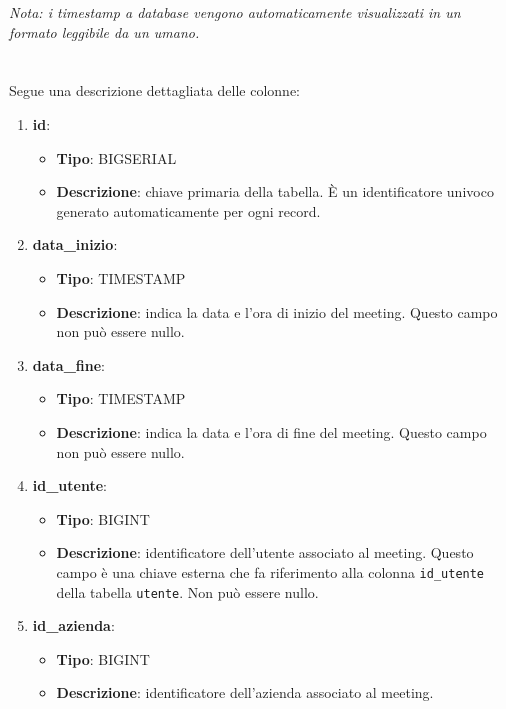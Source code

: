 \textit{Nota: i timestamp a database vengono automaticamente visualizzati in un formato leggibile da un umano.}
\\
\\
\\
Segue una descrizione dettagliata delle colonne:
\begin{enumerate}
    \item \textbf{id}:
        \begin{itemize}
            \item \textbf{Tipo}: BIGSERIAL
            \item \textbf{Descrizione}: chiave primaria della tabella. È un identificatore univoco generato automaticamente per ogni record.
        \end{itemize}
    \item \textbf{data_inizio}:
        \begin{itemize}
            \item \textbf{Tipo}: TIMESTAMP
            \item \textbf{Descrizione}: indica la data e l'ora di inizio del meeting. Questo campo non può essere nullo.
        \end{itemize}
    \item \textbf{data_fine}:
        \begin{itemize}
            \item \textbf{Tipo}: TIMESTAMP
            \item \textbf{Descrizione}: indica la data e l'ora di fine del meeting. Questo campo non può essere nullo.
        \end{itemize}
    \item \textbf{id_utente}:
        \begin{itemize}
            \item \textbf{Tipo}: BIGINT
            \item \textbf{Descrizione}: identificatore dell'utente associato al meeting. 
            Questo campo è una chiave esterna che fa riferimento alla colonna \texttt{id_utente} della tabella \texttt{utente}. 
            Non può essere nullo.
        \end{itemize}
\clearpage
    \item \textbf{id_azienda}:
        \begin{itemize}
            \item \textbf{Tipo}: BIGINT
            \item \textbf{Descrizione}: identificatore dell'azienda associato al meeting.  \\

\end{itemize}
\end{enumerate}

